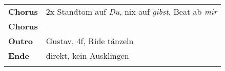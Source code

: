 \begin{tabular}{p{1.6cm}l}
	\textbf{Chorus} & 2x Standtom auf \textit{Du}, nix auf \textit{gibst}, Beat ab \textit{mir} \\
	\textbf{Chorus} &                                                                           \\
	\textbf{Outro}  & Gustav, 4f, Ride tänzeln                                                  \\
	\textbf{Ende}   & direkt, kein Ausklingen                                                   \\
	                &                                                                           \\
\end{tabular}

